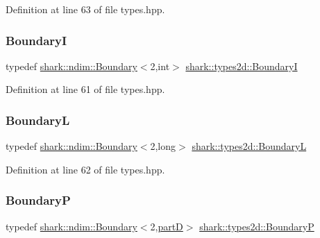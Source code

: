 Definition at line 63 of file types.\+hpp.

\hypertarget{namespaceshark_1_1types2d_af9530bdbc6f563435c3b32a3e38f38dd}{}\label{namespaceshark_1_1types2d_af9530bdbc6f563435c3b32a3e38f38dd} 
\subsubsection{\texorpdfstring{BoundaryI}{BoundaryI}}
{\footnotesize\ttfamily typedef \hyperlink{classshark_1_1ndim_1_1_boundary}{shark\+::ndim\+::\+Boundary}$<$2,int$>$ \hyperlink{namespaceshark_1_1types2d_af9530bdbc6f563435c3b32a3e38f38dd}{shark\+::types2d\+::\+BoundaryI}}



Definition at line 61 of file types.\+hpp.

\hypertarget{namespaceshark_1_1types2d_acd96cb94805f075974d2530ce0553668}{}\label{namespaceshark_1_1types2d_acd96cb94805f075974d2530ce0553668} 
\subsubsection{\texorpdfstring{BoundaryL}{BoundaryL}}
{\footnotesize\ttfamily typedef \hyperlink{classshark_1_1ndim_1_1_boundary}{shark\+::ndim\+::\+Boundary}$<$2,long$>$ \hyperlink{namespaceshark_1_1types2d_acd96cb94805f075974d2530ce0553668}{shark\+::types2d\+::\+BoundaryL}}



Definition at line 62 of file types.\+hpp.

\hypertarget{namespaceshark_1_1types2d_acfe057fc2cca7dd337422740693dc90a}{}\label{namespaceshark_1_1types2d_acfe057fc2cca7dd337422740693dc90a} 
\subsubsection{\texorpdfstring{BoundaryP}{BoundaryP}}
{\footnotesize\ttfamily typedef \hyperlink{classshark_1_1ndim_1_1_boundary}{shark\+::ndim\+::\+Boundary}$<$2,\hyperlink{namespaceshark_1_1types2d_a87ef5d69759f5e1abf90fa90d89ff15c}{partD}$>$ \hyperlink{namespaceshark_1_1types2d_acfe057fc2cca7dd337422740693dc90a}{shark\+::types2d\+::\+BoundaryP}}



